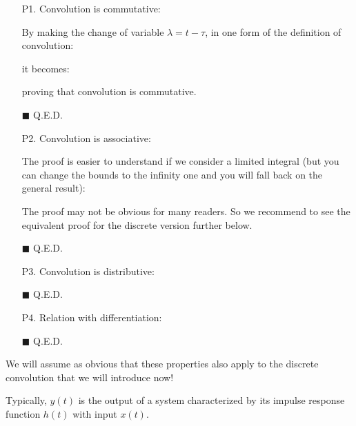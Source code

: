 	\begin{itemize}
		\item[P1.] Convolution is commutative:
		
		\begin{dem}
		By making the change of variable $\lambda=t-\tau$, in one form of the definition of convolution:
		
		it becomes:
		
		proving that convolution is commutative.
		\begin{flushright}
			$\blacksquare$  Q.E.D.
		\end{flushright}
		\end{dem}
		
		\item[P2.] Convolution is associative:
		
		\begin{dem}
		The proof is easier to understand if we consider a limited integral (but you can change the bounds to the infinity one and you will fall back on the general result):
		
		 The proof may not be obvious for many readers. So we recommend to see the equivalent proof for the discrete version further below.
		\begin{flushright}
			$\blacksquare$  Q.E.D.
		\end{flushright}
		\end{dem}
		
		\item[P3.] Convolution is distributive:
		
		\begin{dem}
		
		\begin{flushright}
			$\blacksquare$  Q.E.D.
		\end{flushright}
		\end{dem}
		
		\item[P4.] Relation with differentiation:
		
		\begin{dem}
		
		\begin{flushright}
			$\blacksquare$  Q.E.D.
		\end{flushright}
		\end{dem}
	\end{itemize}
	We will assume as obvious that these properties also apply to the discrete convolution that we will introduce now!
	
	Typically, $y(t)$ is the output of a system characterized by its impulse response function $h(t)$ with input $x(t)$.
	
